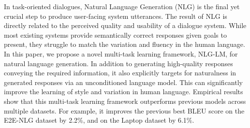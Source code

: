 In task-oriented dialogues, Natural Language Generation (NLG) is the final yet crucial step to produce user-facing system utterances. The result of NLG is directly related to the perceived quality and usability of a dialogue system. While most existing systems provide semantically correct responses given goals to present, they struggle to match the variation and fluency in the human language. In this paper, we propose a novel multi-task learning framework, NLG-LM, for natural language generation. In addition to generating high-quality responses conveying the required information, it also explicitly targets for naturalness in generated responses via an unconditioned language model. This can significantly improve the learning of style and variation in human language. Empirical results show that this multi-task learning framework outperforms previous models across multiple datasets. For example, it improves the previous best BLEU score on the E2E-NLG dataset by 2.2\%, and on the Laptop dataset by 6.1\%.